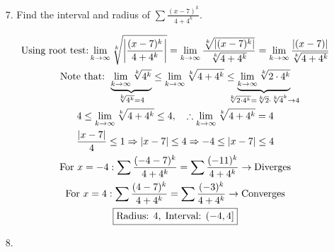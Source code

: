 \begin{itemize}
        \item [7.] Find the interval and radius of $\sum\frac{(x-7)^{k}}{4+4^{k}}$.
        \\
        \begin{mdframed}
            \begin{equation*}
                \begin{gathered}
                    \text{Using root test:}                                     
                    \lim_{k \to \infty}
                    \sqrt[k]{\left|\frac{(x-7)^{k}}{4+4^{k}}\right|} =
                    \lim_{k \to \infty}
                    \frac{\sqrt[k]{|(x-7)^{k}|}}{\sqrt[k]{4+4^{k}}} =
                    \lim_{k \to \infty}
                    \frac{|(x-7)|}{\sqrt[k]{4+4^{k}}}                           \\
                    \text{Note that: } 
                    \underbrace{\lim_{k \to \infty}\sqrt[k]{4^{k}}}
                    _{\mathclap{\sqrt[k]{4^{k}} = 4}} \leq
                    \lim_{k \to \infty}\sqrt[k]{4+4^{k}} \leq
                    \underbrace{\lim_{k \to \infty}\sqrt[k]{2\cdot4^{k}}}
                    _{\mathclap{\sqrt[k]{2\cdot4^{k}} = 
                    \sqrt[k]{2}\cdot\sqrt[k]{4}^{k} \to 4}}  \\
                    4 \leq \lim_{k \to \infty}\sqrt[k]{4+4^{k}} \leq 4, \quad 
                    \therefore \lim_{k \to \infty}\sqrt[k]{4+4^{k}} = 4         \\
                    \frac{|x-7|}{4} \leq 1 \Rightarrow
                    |x-7| \leq 4 \Rightarrow
                    -4 \leq |x-7| \leq 4                                        \\
                    \text{For } x=-4:
                    \sum\frac{(-4-7)^{k}}{4+4^{k}} = 
                    \sum\frac{(-11)^{k}}{4+4^{k}} \to \text{Diverges}          \\
                    \text{For } x=4:
                    \sum\frac{(4-7)^{k}}{4+4^{k}} = 
                    \sum\frac{(-3)^{k}}{4+4^{k}} \to \text{Converges}           \\
                    \boxed{\text{Radius: } 4, \; \text{Interval: } (-4,4]}
                \end{gathered}
            \end{equation*}
        \end{mdframed}

        \item [8.] 
    \end{itemize}
